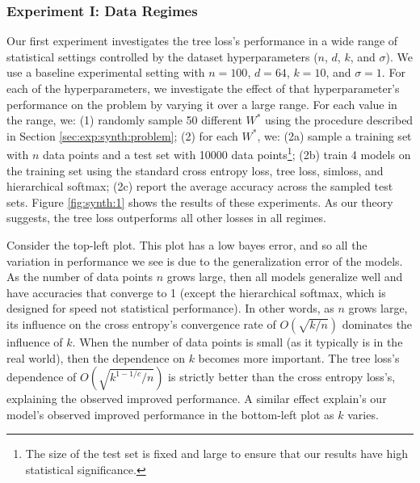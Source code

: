 \documentclass[twoside]{article}
\DeclareMathOperator*{\argmin}{arg\,min}
\renewcommand{\star}[1]{{#1}^{*}}
\newcommand{\x}{\mathbf x}
\begin{document}


\subsubsection{Experiment I: Data Regimes}
\label{sec:synth:1}

Our first experiment investigates the tree loss's performance in a wide range of statistical settings controlled by the dataset hyperparameters ($n$, $d$, $k$, and $\sigma$).
We use a baseline experimental setting with $n=100$, $d=64$, $k=10$, and $\sigma=1$.
For each of the hyperparameters, we investigate the effect of that hyperparameter's performance on the problem by varying it over a large range.
For each value in the range, we:
(1) randomly sample 50 different $\star W$ using the procedure described in Section \ref{sec:exp:synth:problem};
(2) for each $\star W$, we:
(2a) sample a training set with $n$ data points and a test set with 10000 data points\footnote{The size of the test set is fixed and large to ensure that our results have high statistical significance.};
(2b) train 4 models on the training set using the standard cross entropy loss, tree loss, simloss, and hierarchical softmax;
(2c) report the average accuracy across the sampled test sets.
Figure \ref{fig:synth:1} shows the results of these experiments.
As our theory suggests, the tree loss outperforms all other losses in all regimes.

Consider the top-left plot.
This plot has a low bayes error, and so all the variation in performance we see is due to the generalization error of the models.
As the number of data points $n$ grows large,
then all models generalize well and have accuracies that converge to 1 (except the hierarchical softmax, which is designed for speed not statistical performance).
In other words, as $n$ grows large, its influence on the cross entropy's convergence rate of $O(\sqrt{k/n})$ dominates the influence of $k$.
When the number of data points is small (as it typically is in the real world),
then the dependence on $k$ becomes more important.
The tree loss's dependence of $O(\sqrt{k^{1-1/c}/n})$ is strictly better than the cross entropy loss's,
explaining the observed improved performance.
A similar effect explain's our model's observed improved performance in the bottom-left plot as $k$ varies.
\end{document}
